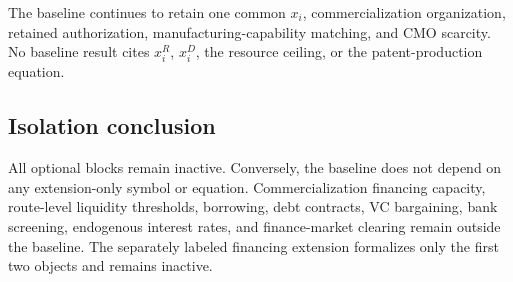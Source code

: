 The baseline continues to retain one common \(x_i\), commercialization
organization, retained authorization, manufacturing-capability matching, and
CMO scarcity. No baseline result cites \(x_i^R\), \(x_i^D\), the resource
ceiling, or the patent-production equation.

\subsection{Isolation conclusion}
\label{subsec:p11-isolation}

All optional blocks remain inactive. Conversely, the baseline does not depend
on any extension-only symbol or equation. Commercialization financing
capacity, route-level liquidity thresholds, borrowing, debt contracts, VC
bargaining, bank screening, endogenous interest rates, and finance-market
clearing remain outside the baseline. The separately labeled financing
extension formalizes only the first two objects and remains inactive.
